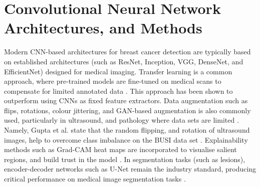 \documentclass[../main]{subfiles}
\begin{document}
\section{Convolutional Neural Network Architectures, and Methods}
\label{sec:cnn-arch}
Modern CNN-based architectures for breast cancer detection are typically based on established architectures (such as ResNet, Inception, VGG, DenseNet, and EfficientNet) designed for medical imaging. Transfer learning is a common approach, where pre-trained models are fine-tuned on medical scans to compensate for limited annotated data \autocite{srikantamurthy2023classification}. This approach has been shown to outperform using CNNs as fixed feature extractors. Data augmentation such as flips, rotations, colour jittering, and GAN-based augmentation is also commonly used, particularly in ultrasound, and pathology where data sets are limited \autocite{latha2024revolutionizing}. Namely, Gupta et al. state that the random flipping, and rotation of ultrasound images, help to overcome class imbalance on the BUSI data set \autocite{latha2024revolutionizing}. Explainability methods such as Grad-CAM heat maps are incorporated to visualise salient regions, and build trust in the model \autocite{latha2024revolutionizing} \autocite{kaba2024explainable}. In segmentation tasks (such as lesions), encoder-decoder networks such as U-Net remain the industry standard, producing critical performance on medical image segmentation tasks \autocite{jiang2024deep}.
\end{document}
